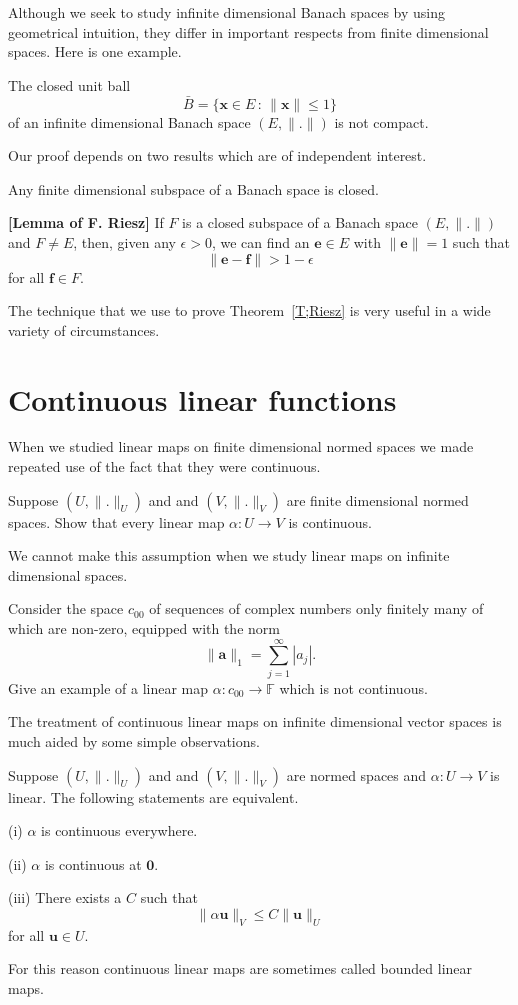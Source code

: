 Although we seek to study infinite dimensional
Banach spaces by using geometrical
intuition, they differ in important respects from finite
dimensional spaces. Here is one example.
\begin{theorem}\label{T;not compact} The closed unit ball
\[\bar{B}=\{{\mathbf x}\in E\,:\,\|{\mathbf x}\|\leq 1\}\]
of an infinite dimensional Banach space $(E,\|.\|)$
is not compact.
\end{theorem}
Our proof depends on two results which are of independent interest.
\begin{lemma} Any finite dimensional subspace
of a Banach space is closed.
\end{lemma}
\begin{theorem}\label{T;Riesz}{\bf [Lemma of F. Riesz]} 
If $F$ is a closed subspace of a  Banach space $(E,\|.\|)$
and $F\neq E$, then, given any $\epsilon>0$, we can find
an ${\mathbf e}\in E$ with $\|{\mathbf e}\|=1$ such that
\[\|{\mathbf e}- {\mathbf f}\|>1-\epsilon\]
for all ${\mathbf f}\in F$.
\end{theorem}
The technique that we use to prove Theorem~\ref{T;Riesz}
is very useful in a wide variety of circumstances.
\section{Continuous linear functions} When we studied linear maps on
finite dimensional normed spaces we made repeated use of
the fact that they were continuous.
\begin{exercise} Suppose $(U,\|.\|_{U})$ and
and $(V,\|.\|_{V})$ are finite dimensional normed spaces.
Show that every linear map $\alpha:U\rightarrow V$
is continuous.
\end{exercise}
We cannot make this assumption when we study linear
maps on infinite dimensional spaces.
\begin{exercise}\label{E;not continuous linear} 
Consider the space $c_{00}$ of sequences
of complex numbers only finitely many of which are non-zero,
equipped with the norm
\[\|{\mathbf a}\|_{1}=\sum_{j=1}^{\infty}|a_{j}|.\]
Give an example of a linear map
$\alpha:c_{00}\rightarrow{\mathbb F}$ which is not continuous.
\end{exercise}
The treatment of continuous linear maps on
infinite
dimensional vector spaces is much aided by some simple observations.
\begin{lemma}  Suppose $(U,\|.\|_{U})$ and
and $(V,\|.\|_{V})$ are normed spaces
and $\alpha:U\rightarrow V$ is linear. 
The following statements are equivalent.

(i) $\alpha$ is continuous everywhere.

(ii) $\alpha$ is continuous at ${\boldsymbol 0}$.

(iii) There exists a $C$ such that
\[\|\alpha{\mathbf u}\|_{V}\leq C\|{\mathbf u}\|_{U}\]
for all ${\mathbf u}\in U$.
\end{lemma}
For this reason continuous linear maps are sometimes called bounded linear 
maps. 

